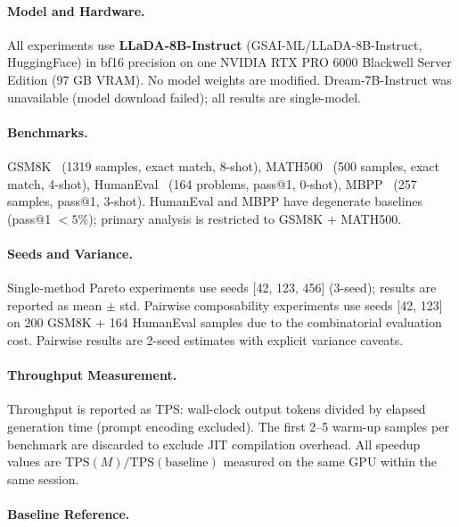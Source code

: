 \documentclass{article}
\newcommand{\tps}{\text{TPS}}
\begin{document}
\paragraph{Model and Hardware.} All experiments use \textbf{LLaDA-8B-Instruct}
(GSAI-ML/LLaDA-8B-Instruct, HuggingFace) in bf16 precision on one NVIDIA RTX PRO 6000 Blackwell
Server Edition (97 GB VRAM). No model weights are modified. Dream-7B-Instruct was unavailable
(model download failed); all results are single-model.

\paragraph{Benchmarks.} GSM8K~\cite{cobbe2021training} (1319 samples, exact match, 8-shot),
MATH500~\cite{hendrycks2021measuring} (500 samples, exact match, 4-shot), HumanEval~\cite{chen2021evaluating}
(164 problems, pass@1, 0-shot), MBPP~\cite{austin2021program} (257 samples, pass@1, 3-shot).
HumanEval and MBPP have degenerate baselines (pass@1 $< 5\%$); primary analysis is restricted to
GSM8K + MATH500.

\paragraph{Seeds and Variance.} Single-method Pareto experiments use seeds [42, 123, 456] (3-seed);
results are reported as mean $\pm$ std. Pairwise composability experiments use seeds [42, 123] on
200 GSM8K + 164 HumanEval samples due to the combinatorial evaluation cost. Pairwise results are
2-seed estimates with explicit variance caveats.

\paragraph{Throughput Measurement.} Throughput is reported as TPS: wall-clock output tokens divided
by elapsed generation time (prompt encoding excluded). The first 2--5 warm-up samples per benchmark
are discarded to exclude JIT compilation overhead. All speedup values are
$\tps(M) / \tps(\text{baseline})$ measured on the same GPU within the same session.

\paragraph{Baseline Reference.}
\end{document}
